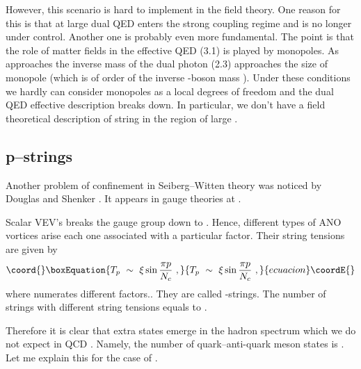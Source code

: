 \documentclass[a4paper,12pt]{article}
\begin{document}
However, this scenario is hard to implement in the field
theory. One reason for this is that at large \myHighlight{$\mu $}\coordHE{} dual QED
enters the strong coupling regime and is no longer under control.
 Another one is probably even
more fundamental. The point is that  the role of matter fields
in the effective QED (3.1) is played by monopoles. As \myHighlight{$\mu $}\coordHE{}
approaches \myHighlight{$\Lambda$}\coordHE{} the inverse mass of the dual photon (2.3)
approaches the size of monopole (which is of order of the inverse
\coordHE{}-boson mass \coordHE{}). Under these
conditions we hardly can consider monopoles as a local degrees
of freedom and the dual QED effective description breaks down.
In particular, we don't have a field theoretical description of
\coordHE{} string in the region of large \myHighlight{$\mu \ge\Lambda$}\coordHE{}.

\subsection{p--strings}

Another problem of \coordHE{} confinement in Seiberg--Witten theory
was noticed by Douglas and Shenker \cite{DS}. It appears in
\coordHE{} gauge theories at \coordHE{}.

Scalar VEV's breaks the gauge group down to \coordHE{}.
Hence, \coordHE{} different types of ANO vortices arise  each
one associated with a particular
\coordHE{} factor. Their string tensions are given by \cite{DS}
\begin{equation}\coord{}\boxEquation{
T_p\ \sim\ \xi\sin\frac{\pi p}{N_c}\ ,
}{
T_p\ \sim\ \xi\sin\frac{\pi p}{N_c}\ ,
}{ecuacion}\coordE{}\end{equation}
where \coordHE{} numerates different \coordHE{} factors..
They are called \coordHE{}-strings. The number of strings with
different string tensions equals to \myHighlight{$[(N_c-1)/2]$}\coordHE{}.

Therefore it is clear that extra states emerge in the hadron
spectrum which we do not expect in QCD \cite{DS}. Namely, the
number of quark--anti-quark meson states is \coordHE{}. Let me explain
this for the case of \coordHE{}.
\end{document}
